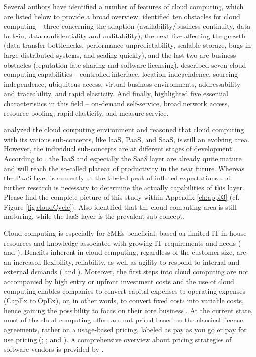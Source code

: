 Several authors have identified a number of features of cloud computing, which are listed below to provide a broad overview. \citet[pp. 54-58]{Armbrust2010} identified ten obstacles for cloud computing -- three concerning the adaption (availability/business continuity, data lock-in, data confidentiality and auditability), the next five affecting the growth (data transfer bottlenecks, performance unpredictability, scalable storage, bugs in large distributed systems, and scaling quickly), and the last two are business obstacles (reputation fate sharing and software licensing). \citet[pp. 120-127]{Iyer2010} described seven cloud computing capabilities -- controlled interface, location independence, sourcing independence, ubiquitous access, virtual business environments, addressability and traceability, and rapid elasticity. And finally, \citet[p. 2]{Mell2011} highlighted five essential characteristics in this field -- on-demand self-service, broad network access, resource pooling, rapid elasticity, and measure service. 

\citet{Smith2012} analyzed the cloud computing environment and reasoned that cloud computing with its various sub-concepts, like \ac{IaaS}, \ac{PaaS}, and \ac{SaaS}, is still an evolving area. However, the individual sub-concepts are at different stages of development. According to \citet[p. 5]{Smith2012}, the \ac{IaaS} and especially the \ac{SaaS} layer are already quite mature and will reach the so-called plateau of productivity in the near future. Whereas the \ac{PaaS} layer is currently at the labeled peak of inflated expectations and further research is necessary to determine the actually capabilities of this layer. Please find the complete picture of this study within Appendix \ref{ch:app03} (cf. Figure \ref{fig:cloudCycle}). Also \citet[p. 120]{Iyer2010} identified that the cloud computing area is still maturing, while the \ac{IaaS} layer is the prevalent sub-concept.

Cloud computing is especially for \acp{SME} beneficial, based on limited IT in-house resources and knowledge associated with growing IT requirements and needs (\citealp[p. 398]{Weinhardt2009} and \citealp{Karabek2011}). Benefits inherent in cloud computing, regardless of the customer size, are an increased flexibility, reliability, as well as agility to respond to internal and external demands (\citealp[p. 51]{Vaquero2009} and \citealp[p. 129]{Iyer2010}). Moreover, the first steps into cloud computing are not accompanied by high entry or upfront investment costs and the use of cloud computing enables companies to convert capital expenses to operating expenses (CapEx to OpEx), or, in other words, to convert fixed costs into variable costs, hence gaining the possibility to focus on their core business \citep[pp. 51-53]{Armbrust2010}. At the current state, most of the cloud computing offers are not priced based on the classical license agreements, rather on a usage-based pricing, labeled as pay as you go or pay for use pricing (\citealp[pp. 50-54]{Vaquero2009}; \citealp[pp. 51-53,58]{Armbrust2010}; and \citealp[p. 2]{Iyer2010}). A comprehensive overview about pricing strategies of software vendors is provided by \citet{Lehmann2009}.


